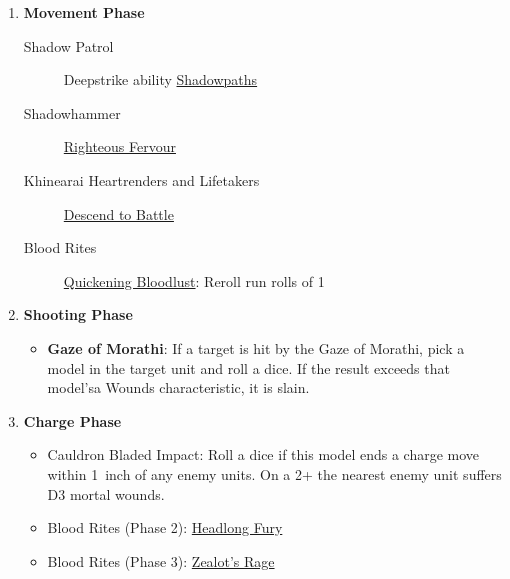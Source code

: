 \begin{enumerate}
\begin{description}[align=left]
    \end{description}

    \item{\textbf{Movement Phase}}\hypertarget{movementphase}{}
    \begin{description}
      \item [Shadow Patrol] Deepstrike ability \hyperref[shadowpaths]{Shadowpaths}
      \item [Shadowhammer] \hyperref[righteous-fervour]{Righteous Fervour}
      \item [Khinearai Heartrenders and Lifetakers]
          \hyperref[descend-to-battle]{Descend to Battle}
      \item [Blood Rites] \hyperref[quickening-bloodlust]{Quickening Bloodlust}:
          Reroll run rolls of 1
    \end{description}


    \item{\textbf{Shooting Phase}}\hypertarget{shootingphase}{}

    \begin{itemize}
    \tightlist
    \item
      \textbf{Gaze of Morathi}: If a target is hit by the Gaze of Morathi,
      pick a model in the target unit and roll a dice. If the result exceeds
      that model'sa Wounds characteristic, it is slain. 
    \end{itemize}

    \item{\textbf{Charge Phase}}
        \begin{itemize} 
            \item Cauldron \textbar{} Bladed Impact: Roll a dice if this model
                ends a charge move within 1~inch of any enemy units. On a 2+
                the nearest enemy unit suffers D3 mortal wounds.
            \item Blood Rites (Phase 2): \hyperref[headling-fury]{Headlong Fury}
            \item Blood Rites (Phase 3): \hyperref[zealots-rage]{Zealot's
                Rage}
        \end{itemize}


\end{enumerate}

